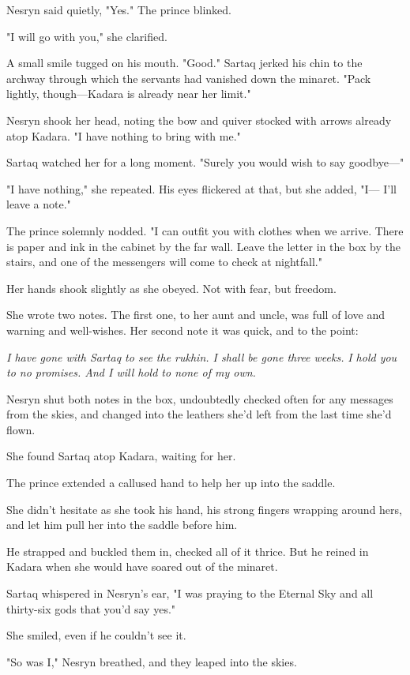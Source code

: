 Nesryn said quietly, "Yes." The prince blinked.

"I will go with you," she clarified.

A small smile tugged on his mouth. "Good." Sartaq jerked his chin to the archway through which the servants had vanished down the minaret. "Pack lightly, though---Kadara is already near her limit."

Nesryn shook her head, noting the bow and quiver stocked with arrows already atop Kadara. "I have nothing to bring with me."

Sartaq watched her for a long moment. "Surely you would wish to say goodbye---"

"I have nothing," she repeated. His eyes flickered at that, but she added, "I--- I'll leave a note."

The prince solemnly nodded. "I can outfit you with clothes when we arrive. There is paper and ink in the cabinet by the far wall. Leave the letter in the box by the stairs, and one of the messengers will come to check at nightfall."

Her hands shook slightly as she obeyed. Not with fear, but 
freedom.

She wrote two notes. The first one, to her aunt and uncle, was full of love and warning and well-wishes. Her second note  it was quick, and to the point:

\emph{I have gone with Sartaq to see the rukhin. I shall be gone three weeks.} \emph{I hold you to no promises. And I will hold to none of my own.}

Nesryn shut both notes in the box, undoubtedly checked often for any messages from the skies, and changed into the leathers she'd left from the last time she'd flown.

She found Sartaq atop Kadara, waiting for her.

The prince extended a callused hand to help her up into the saddle.

She didn't hesitate as she took his hand, his strong fingers wrapping around hers, and let him pull her into the saddle before him.

He strapped and buckled them in, checked all of it thrice. But he reined in Kadara when she would have soared out of the minaret.

Sartaq whispered in Nesryn's ear, "I was praying to the Eternal Sky and all thirty-six gods that you'd say yes."

She smiled, even if he couldn't see it.

"So was I," Nesryn breathed, and they leaped into the skies.

